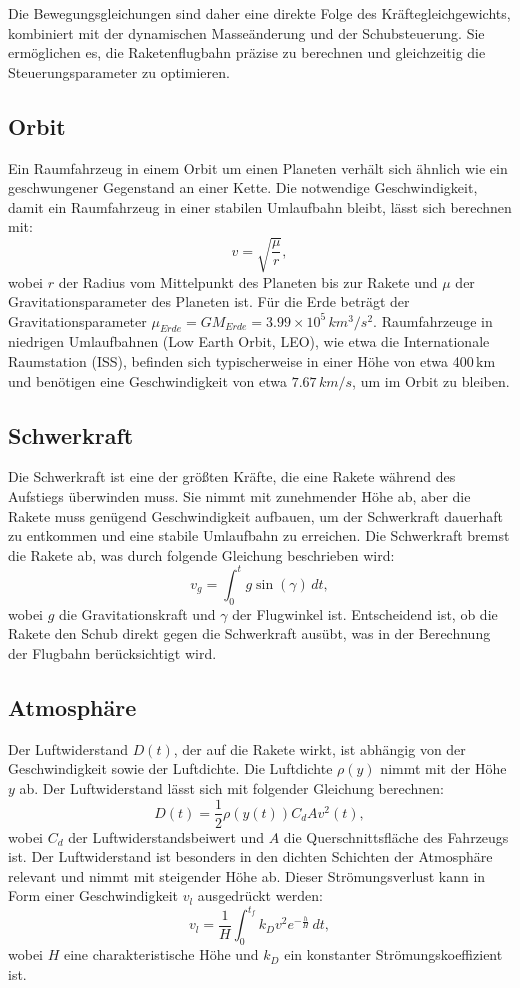 Die Bewegungsgleichungen sind daher eine direkte Folge des Kräftegleichgewichts, kombiniert mit der dynamischen Masseänderung und der Schubsteuerung. 
Sie ermöglichen es, die Raketenflugbahn präzise zu berechnen und gleichzeitig die Steuerungsparameter zu optimieren.


\subsection{Orbit \label{leo:orbit}}
Ein Raumfahrzeug in einem Orbit um einen Planeten verhält sich ähnlich wie ein geschwungener Gegenstand an einer Kette. 
Die notwendige Geschwindigkeit, damit ein Raumfahrzeug in einer stabilen Umlaufbahn bleibt, lässt sich berechnen mit:
\[
v = \sqrt{\frac{\mu}{r}},
\]
wobei \(r\) der Radius vom Mittelpunkt des Planeten bis zur Rakete und \(\mu\) der Gravitationsparameter des Planeten ist. 
Für die Erde beträgt der Gravitationsparameter \(\mu_{Erde} = GM_{Erde} = 3.99 \times 10^5 \, km^3/s^2\). Raumfahrzeuge in niedrigen Umlaufbahnen (Low Earth Orbit, LEO), wie etwa die Internationale Raumstation (ISS), befinden sich typischerweise in einer Höhe von etwa 400\,km und benötigen eine Geschwindigkeit von etwa \(7.67 \, km/s\), um im Orbit zu bleiben.

\subsection{Schwerkraft}
Die Schwerkraft ist eine der größten Kräfte, die eine Rakete während des Aufstiegs überwinden muss. 
Sie nimmt mit zunehmender Höhe ab, aber die Rakete muss genügend Geschwindigkeit aufbauen, um der Schwerkraft dauerhaft zu entkommen und eine stabile Umlaufbahn zu erreichen. 
Die Schwerkraft bremst die Rakete ab, was durch folgende Gleichung beschrieben wird:
\[
v_g = \int_0^t g \sin(\gamma) \, dt,
\]
wobei \(g\) die Gravitationskraft und \(\gamma\) der Flugwinkel ist. 
Entscheidend ist, ob die Rakete den Schub direkt gegen die Schwerkraft ausübt, was in der Berechnung der Flugbahn berücksichtigt wird.

\subsection{Atmosphäre}
Der Luftwiderstand \(D(t)\), der auf die Rakete wirkt, ist abhängig von der Geschwindigkeit sowie der Luftdichte. 
Die Luftdichte \(\rho(y)\) nimmt mit der Höhe \(y\) ab. Der Luftwiderstand lässt sich mit folgender Gleichung berechnen:
\[
D(t) = \frac{1}{2} \rho(y(t)) C_d A v^2(t),
\]
wobei \(C_d\) der Luftwiderstandsbeiwert und \(A\) die Querschnittsfläche des Fahrzeugs ist. 
Der Luftwiderstand ist besonders in den dichten Schichten der Atmosphäre relevant und nimmt mit steigender Höhe ab. 
Dieser Strömungsverlust kann in Form einer Geschwindigkeit \(v_l\) ausgedrückt werden:
\[
v_l = \frac{1}{H} \int_0^{t_f} k_D v^2 e^{-\frac{h}{H}} \, dt,
\]
wobei \(H\) eine charakteristische Höhe und \(k_D\) ein konstanter Strömungskoeffizient ist.



